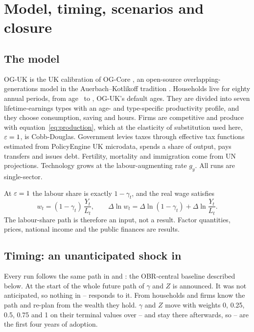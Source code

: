 \section{Model, timing, scenarios and closure}
\label{sec:methodology}

\subsection{The model}
\label{sec:model}

OG-UK is the UK calibration of OG-Core \citep{ogcore,debacker2019pfr}, an open-source overlapping-generations model in the Auerbach--Kotlikoff tradition \citep{auerbach1987}. Households live for eighty annual periods, from age~\genModelFirstAge{} to \genModelLastAge{}, OG-UK's default ages. They are divided into seven lifetime-earnings types with an age- and type-specific productivity profile, and they choose consumption, saving and hours. Firms are competitive and produce with equation~\eqref{eq:production}, which at the elasticity of substitution used here, $\varepsilon = 1{}$, is Cobb-Douglas. Government levies taxes through effective tax functions estimated from PolicyEngine UK microdata, spends a share of output, pays transfers and issues debt. Fertility, mortality and immigration come from UN projections. Technology grows at the labour-augmenting rate $g_y$. All runs are single-sector.

At $\varepsilon = 1{}$ the labour share is exactly $1-\gamma_t$, and the real wage satisfies
\begin{equation}
\label{eq:wageidentity}
w_t = (1-\gamma_t)\,\frac{Y_t}{L_t},
\qquad
\Delta \ln w_t = \Delta \ln (1-\gamma_t) + \Delta \ln \frac{Y_t}{L_t}.
\end{equation}
The labour-share path is therefore an input, not a result. Factor quantities, prices, national income and the public finances are results.

\subsection{Timing: an unanticipated shock in \genShockYear{}}
\label{sec:timing}

Every run follows the same path in \genStartYear{} and \genRampZeroYear{}: the OBR-central baseline described below. At the start of \genShockYear{} the whole future path of $\gamma$ and $Z$ is announced. It was not anticipated, so nothing in \genStartYear--\genRampZeroYear{} responds to it. From \genShockYear{} households and firms know the path and re-plan from the wealth they hold. $\gamma$ and $Z$ move with weights 0, 0.25, 0.5, 0.75 and 1 on their terminal values over \genRampZeroYear--\genHeadYear{} and stay there afterwards, so \genShockYear--\genHeadYear{} are the first four years of adoption.

